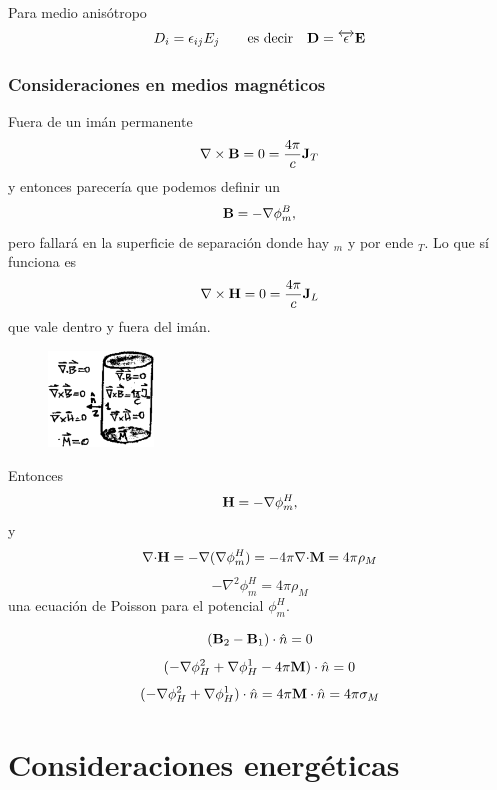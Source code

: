\documentclass[10pt,oneside]{CBFT_book}
\begin{document}
Para medio anisótropo
\[
	D_i = \epsilon_{ij} E_j \qquad \text{es decir} \quad \vb{D} = \overleftrightarrow{\epsilon} \vb{E}
\]

\subsubsection{Consideraciones en medios magnéticos}

Fuera de un imán permanente 
\[
	\rotorm{B} = 0 = \frac{4\pi}{c}\vb{J}_T
\]
y entonces parecería que podemos definir un
\[
	\vb{B} = -\Nabla \phi_m^B,
\]
pero fallará en la superficie de separación donde hay $_m$ y por ende $_T$. Lo que sí funciona
es
\[
	\rotorm{H} = 0 = \frac{4\pi}{c}\vb{J}_L
\]
que vale dentro y fuera del imán.
\begin{figure}[htb]
	\begin{center}
	\includegraphics[width=0.25\textwidth]{images/fig_ft1_medios2.pdf}	 
	\end{center}
	\caption{}
\end{figure}

Entonces
\[
	\vb{H} = -\Nabla \phi_m^H,
\]
y
\[
	\mathbf{\nabla}\mathbf{\cdot}\mathbf{H} = -\mathbf{\nabla}(\mathbf{\nabla} \phi^H_m ) = -4\pi \mathbf{\nabla}\mathbf{\cdot}\mathbf{M} = 4\pi\rho_M
\]
\[
	-\nabla^2 \phi_m^H = 4\pi\rho_M
\]
una ecuación de Poisson para el potencial $\phi_m^H$.

\[
	(\vb{B}_2 - \vb{B}_1)\cdot\hat{n} = 0
\]
\[
	(-\Nabla \phi^2_H + \Nabla \phi^1_H - 4\pi \vb{M})\cdot\hat{n} = 0
\]
\[
	(-\Nabla \phi^2_H + \Nabla \phi^1_H )\cdot\hat{n} = 4\pi \vb{M}\cdot\hat{n} = 4\pi \sigma_M
\]

\section{Consideraciones energéticas}
\end{document}
